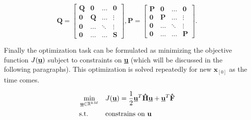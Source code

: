 \begin{equation}
\label{eq:qmpc_weighting_matrices}
\textbf{\^Q} = \begin{bmatrix}
\textbf{Q} & \textbf{0} & \hdots & \textbf{0} \\
\textbf{0} & \textbf{Q} & \hdots & \vdots \\
\textbf{0} & \hdots & \ddots & \vdots \\
\textbf{0} & \hdots & \hdots & \textbf{S}
\end{bmatrix},
\textbf{\^P} = \begin{bmatrix}
\textbf{P} & \textbf{0} & \hdots & \textbf{0} \\
\textbf{0} & \textbf{P} & \hdots & \vdots \\
\textbf{0} & \hdots & \ddots & \vdots \\
\textbf{0} & \hdots & \hdots & \textbf{P}
\end{bmatrix}.
\end{equation}

Finally the optimization task can be formulated as minimizing the objective function $J(\textbf{\underline{u}})$ subject to constraints on \textbf{\underline{u}} (which will be discussed in the following paragraphs). This optimization is solved repeatedly for new $\textbf{x}_{[0]}$ as the time comes.

\begin{equation}
\label{eq:qmpc_main_quadratic_form}
\begin{aligned}
& \min_{\textbf{\underline{u}} \in \mathbb{R}^{kM}}
& & J(\underline{\textbf{u}}) = \frac{1}{2}\textbf{\underline{u}}^T\textbf{\^H}\textbf{\underline{u}} + \textbf{\underline{u}}^T\textbf{\^F}\\
& \text{s.t.}
& & \text{constrains on \textbf{u}}
\end{aligned}
\end{equation}


